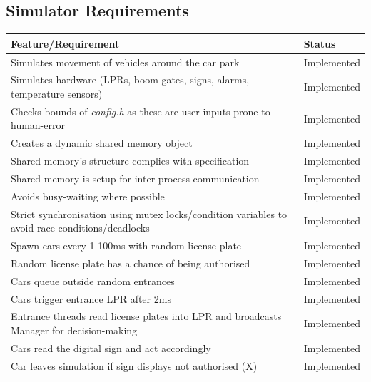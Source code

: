 \documentclass[a4paper]{article}
\begin{document}
\subsection{Simulator Requirements}
\begin{tabular}{|m{24.7em}|l|}
  \hline
  \cellcolor{gray!10} \textbf{Feature\slash Requirement} & \cellcolor{gray!10} \textbf{Status}\\
  \hline
  Simulates movement of vehicles around the car park &\cellcolor{green!40}Implemented\\
  \hline
  Simulates hardware (LPRs, boom gates, signs, alarms, temperature sensors) & \cellcolor{green!40}Implemented\\
  \hline
  Checks bounds of \emph{config.h} as these are user inputs prone to human-error & \cellcolor{green!40}Implemented\\
  \hline
  Creates a dynamic shared memory object &\cellcolor{green!40}Implemented\\
  \hline
  Shared memory’s structure complies with specification &\cellcolor{green!40}Implemented\\
  \hline
  Shared memory is setup for inter-process communication &\cellcolor{green!40}Implemented\\
  \hline
  Avoids busy-waiting where possible & \cellcolor{green!40}Implemented\\
  \hline
  Strict synchronisation using mutex locks/condition variables to avoid race-conditions/deadlocks & \cellcolor{green!40}Implemented\\
  \hline
  Spawn cars every 1-100ms with random license plate& \cellcolor{green!40}Implemented\\
  \hline
  Random license plate has a chance of being authorised & \cellcolor{green!40}Implemented\\
  \hline
  Cars queue outside random entrances & \cellcolor{green!40}Implemented\\
  \hline
  Cars trigger entrance LPR after 2ms & \cellcolor{green!40}Implemented\\
  \hline
  Entrance threads read license plates into LPR and broadcasts Manager for decision-making & \cellcolor{green!40}Implemented\\
  \hline
  Cars read the digital sign and act accordingly & \cellcolor{green!40}Implemented\\
  \hline
  Car leaves simulation if sign displays not authorised (X) & \cellcolor{green!40}Implemented\\
  \hline
\end{tabular}
\end{document}
